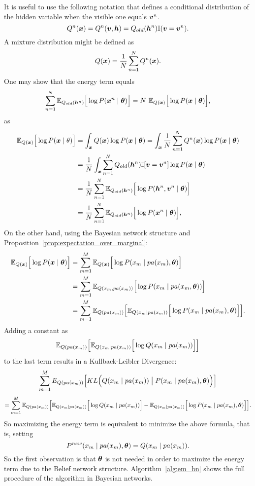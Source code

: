 It is useful to use the following notation that defines a conditional distribution of the hidden variable when the visible one equals \(\bm{v}^{n}\).
\[
  Q^{n}(\bm{x}) = Q^{n}(\bm{v},\bm{h}) = Q_{old}(\bm{h}^{n}) \mathbb{I}(\bm{v} = \bm{v}^{n}).
\]
A mixture distribution might be defined as
\[
  Q(\bm{x}) = \frac{1}{N}\sum_{n = 1}^{N}Q^{n}(\bm{x}).
\]
One may show that the energy term equals
\[
  \sum_{n = 1}^{N}\E{Q_{old}(\bh^n)}{\log{P(\bx^{n} \mid \btheta)}} = N \ \E{Q(\bx)}{\log{P(\bx \mid \btheta)}},
\]
as
\[
  \begin{aligned}
    \mathbb{E}_{Q(\bm{x})}\Big[\log{P(\bm{x}\mid \theta)}\Big] &= \int_{\bm{x}}Q(\bm{x})\log{P(\bm{x}\mid \bm{\theta})} =  \int_{\bm{x}} \frac{1}{N}\sum_{n=1}^{N}Q^{n}(\bm{x})\log{P(\bm{x}\mid \bm{\theta})} \\
    &= \frac{1}{N} \int_{\bm{x}}\sum_{n=1}^{N}Q_{old}(\bm{h}^n)\mathbb{I}[\bm{v} = \bm{v}^{n}]\log{P(\bm{x}\mid \bm{\theta})}\\
    &= \frac{1}{N}\sum_{n = 1}^{N}\mathbb{E}_{Q_{old}(\bm{h}^n)}\Big[\log{P(\bm{h}^n, \bm{v}^{n} \mid \bm{\theta})}\Big]\\
    &= \frac{1}{N}\sum_{n = 1}^{N}\mathbb{E}_{Q_{old}(\bm{h}^n)}\Big[\log{P(\bm{x}^{n} \mid \bm{\theta})}\Big],
  \end{aligned}
\]
On the other hand, using the Bayesian network structure and Proposition~\ref{prop:expectation_over_marginal}:
\[
  \begin{aligned}
    \mathbb{E}_{Q(\bm{x})}\Big[\log{P(\bm{x}\mid \bm{\theta})}\Big] &= \sum_{m = 1}^{M}\mathbb{E}_{Q(\bm{x})}\Big[\log{P(x_{m} \mid pa(x_{m}), \bm{\theta})}\Big]\\
    &= \sum_{m = 1}^{M}\mathbb{E}_{Q(x_{m}, pa(x_{m}))}\Big[\log{P(x_{m} \mid pa(x_{m}, \bm{\theta}))}\Big]\\
    &= \sum_{m = 1}^{M}\mathbb{E}_{Q(pa(x_{m}))}\Big[ \mathbb{E}_{Q(x_{m}\mid pa(x_{m}))}\Big[ \log{P(x_{m} \mid pa(x_{m}), \bm{\theta})}\Big]\Big].
\end{aligned}
\]
Adding a constant as
\[
  \mathbb{E}_{Q(pa(x_{m}))}\Big[\mathbb{E}_{Q(x_{m}\mid pa(x_{m}))}\Big[\log{Q(x_{m} \mid pa(x_{m}))}\Big]\Big]
\]
to the last term results in a Kullback-Leibler Divergence:
\[
  \sum_{m = 1}^{M} E_{Q(pa(x_{m}))} \Big[ KL\Big(Q(x_{m}\mid pa(x_{m})) \bigm| P(x_{m} \mid pa(x_{m}), \bm{\theta})\Big)\Big]
\]
\[
  =\sum_{m = 1}^{M}\mathbb{E}_{Q(pa(x_{m}))}\Big[\mathbb{E}_{Q(x_{m}\mid pa(x_{m}))}\Big[\log{Q(x_{m} \mid pa(x_{m}))}\Big] - \mathbb{E}_{Q(x_{m}\mid pa(x_{m}))}\Big[\log{P(x_{m} \mid pa(x_{m}), \bm{\theta})}\Big]\Big].
\]
So maximizing the energy term is equivalent to minimize the above formula, that is, setting
\[
  P^{new}(x_{m} \mid pa(x_{m}), \bm{\theta}) = Q(x_{m} \mid pa(x_{m})).
\]
So the first observation is that \(\bm{\theta}\) is not needed in order to maximize the energy term due to the Belief network structure. Algorithm~\ref{alg:em_bn} shows the full procedure of the algorithm in Bayesian networks.

